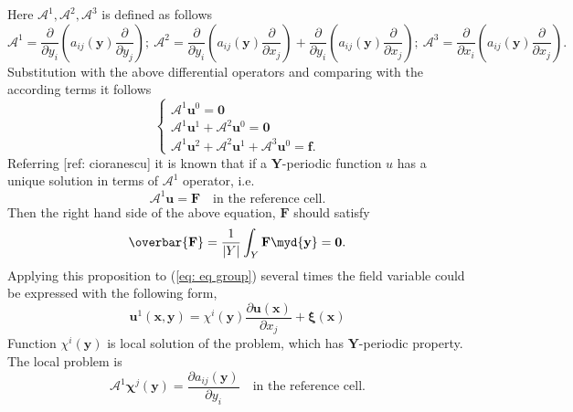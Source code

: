 Here $\mathcal{A}^{1}, \mathcal{A}^{2}, \mathcal{A}^{3}$ is defined as follows
\[
\mathcal{A}^{1} = \dfrac{\partial}{\partial y_{i}} \left( a_{ij}(\mathbf{y}) \dfrac{\partial}{\partial y_{j}} \right); \
\mathcal{A}^{2} = \dfrac{\partial}{\partial y_{i}} \left( a_{ij}(\mathbf{y}) \dfrac{\partial}{\partial x_{j}} \right) + \dfrac{\partial}{\partial y_{i}} \left( a_{ij}(\mathbf{y}) \dfrac{\partial}{\partial x_{j}} \right); \
\mathcal{A}^{3} = \dfrac{\partial}{\partial x_{i}} \left( a_{ij}(\mathbf{y}) \dfrac{\partial}{\partial x_{j}} \right).
\]
Substitution with the above differential operators and comparing with the according terms it follows
\begin{equation}
\label{eq: eq group}
\left\{
\begin{array}{l}
\mathcal{A}^{1} \mathbf{u}^{0} = \mathbf{0} \\
\mathcal{A}^{1} \mathbf{u}^{1} + \mathcal{A}^{2} \mathbf{u}^{0} = \mathbf{0} \\
\mathcal{A}^{1} \mathbf{u}^{2} + \mathcal{A}^{2} \mathbf{u}^{1} + \mathcal{A}^{3} \mathbf{u}^{0} = \mathbf{f}.
\end{array}
\right.
\end{equation}
Referring [ref: cioranescu] it is known that if a $\mathbf{Y}$-periodic function $u$ has a unique solution in terms of $\mathcal{A}^{1}$ operator, i.e. 
\begin{equation}
\mathcal{A}^{1} \mathbf{u} = \mathbf{F} \quad \text{in the reference cell}.
\end{equation}
Then the right hand side of the above equation, $\mathbf{F}$ should satisfy 
\begin{equation}
\overbar{\mathbf{F}} = \dfrac{1}{|Y|}\int_{Y} \mathbf{F} \myd{\mathbf{y}} = \mathbf{0}.
\end{equation}
Applying this proposition to (\ref{eq: eq group}) several times the field variable could be expressed with the following form,
\begin{equation}
\mathbf{u}^{1}(\mathbf{x}, \mathbf{y}) = \chi^{i}(\mathbf{y}) \dfrac{\partial \mathbf{u}(\mathbf{x})}{\partial x_{j}} + \mathbf{\xi} (\mathbf{x})
\end{equation}
Function $\chi^{i}(\mathbf{y})$ is local solution of the problem, which has $\mathbf{Y}$-periodic property. The local problem is
\begin{equation}
\mathcal{A}^{1} \mathbf{\chi}^{j}(\mathbf{y}) = \dfrac{\partial a_{ij}(\mathbf{y})}{\partial y_{i}} \quad \text{in the reference cell}.
\end{equation}
